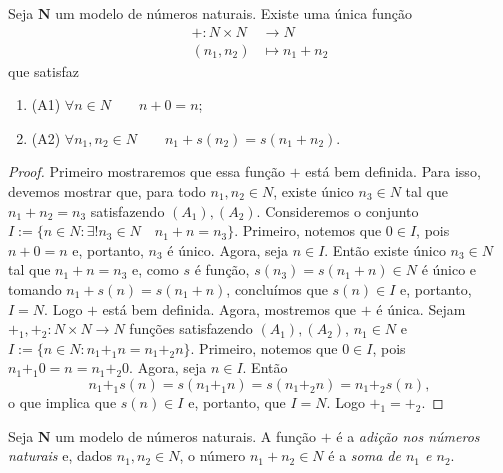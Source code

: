 \begin{teo}
	Seja $\bm N$ um modelo de números naturais. Existe uma única função
	\begin{align*}
	+: N \times N &\to N \\
			(n_1,n_2) &\mapsto n_1+n_2
	\end{align*}
que satisfaz
	\begin{enumerate}
	\item (A1) $\forall n \in N \qquad n + 0 = n$;
	\item (A2) $\forall n_1,n_2 \in N \qquad n_1 + s(n_2) = s(n_1+n_2)$.
	\end{enumerate}
\end{teo}
\begin{proof}
	Primeiro mostraremos que essa função $+$ está bem definida. Para isso, devemos mostrar que, para todo $n_1,n_2 \in N$, existe único $n_3 \in N$ tal que $n_1+n_2=n_3$ satisfazendo $(A_1),(A_2)$. Consideremos o conjunto $I := \{n \in N : \exists! n_3 \in N \quad n_1+n=n_3\}$. Primeiro, notemos que $0 \in I$, pois $n+0=n$ e, portanto, $n_3$ é único. Agora, seja $n \in I$. Então existe único $n_3 \in N$ tal que $n_1+n=n_3$ e, como $s$ é função, $s(n_3)=s(n_1+n) \in N$ é único e tomando $n_1+s(n)=s(n_1+n)$, concluímos que $s(n) \in I$ e, portanto, $I=N$. Logo $+$ está bem definida. Agora, mostremos que $+$ é única. Sejam $+_1,+_2:N \times N \to N$ funções satisfazendo $(A_1),(A_2)$, $n_1 \in N$ e $I := \{n \in N : n_1 +_1 n = n_1 +_2 n \}$. Primeiro, notemos que $0 \in I$, pois $n_1 +_1 0 =n = n_1 +_2 0$. Agora, seja $n \in I$. Então
	\begin{equation*}
	n_1 +_1 s(n) = s(n_1 +_1 n) = s(n_1 +_2 n) = n_1 +_2 s(n),
	\end{equation*}
o que implica que $s(n) \in I$ e, portanto, que $I=N$. Logo $+_1 = +_2$.
\end{proof}

\begin{defi}
	Seja $\bm N$ um modelo de números naturais. A função $+$ é a \emph{adição nos números naturais} e, dados $n_1,n_2 \in N$, o número $n_1 + n_2 \in N$ é a \emph{soma de $n_1$ e $n_2$}.
\end{defi}

